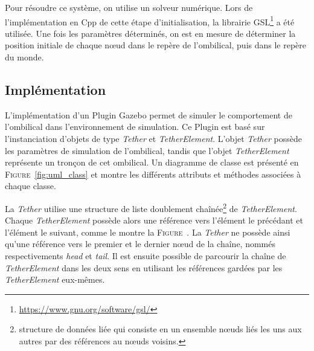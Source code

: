     Pour résoudre ce système, on utilise un solveur numérique. Lors de l'implémentation en \gls{Cpp} de cette étape d'initialisation, la librairie \gls{GSL}\footnote{\url{https://www.gnu.org/software/gsl/}} a été utilisée. Une fois les paramètres déterminés, on est en mesure de déterminer la position initiale de chaque n\oe ud dans le repère de l'ombilical, puis dans le repère du monde.

\subsection{Implémentation}
    L'implémentation d'un \gls{Plugin} \gls{Gazebo} permet de simuler le comportement de l'ombilical dans l'environnement de simulation. Ce \gls{Plugin} est basé sur l'instanciation d'objets de type \textit{Tether} et \textit{TetherElement}. L'objet \textit{Tether} possède les paramètres de simulation de l'ombilical, tandis que l'objet \textit{TetherElement} représente un tronçon de cet ombilical. Un diagramme de classe est présenté en \textsc{Figure}~\ref{fig:uml_class} et montre les différents attributs et méthodes associées à chaque classe.
    
    La \textit{Tether} utilise une structure de liste doublement chaînée\footnote{structure de données liée qui consiste en un ensemble n\oe uds liés les uns aux autres par des références au n\oe uds voisins.} de \textit{TetherElement}. Chaque \textit{TetherElement} possède alors une référence vers l'élément le précédant et l'élément le suivant, comme le montre la \textsc{Figure}~\label{fig:goubly_linked_list}. La \textit{Tether} ne possède ainsi qu'une référence vers le premier et le dernier n\oe ud de la chaîne, nommés respectivements \textit{head} et \textit{tail}. Il est ensuite possible de parcourir la chaîne de \textit{TetherElement} dans les deux sens en utilisant les références gardées par les \textit{TetherElement} eux-mêmes. 

